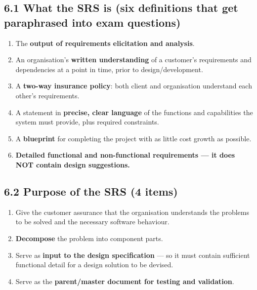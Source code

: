 \begin{studycolumns}
\vspace{0pt}



\subsection*{6.1 What the SRS is (six definitions that get paraphrased into exam questions)}
\begin{enumerate}
\item The \textbf{output of requirements elicitation and analysis}.
\item An organisation's \textbf{written understanding} of a customer's requirements and dependencies at a point in time, prior to design/\allowbreak{}development.
\item A \textbf{two-way insurance policy}: both client and organisation understand each other's requirements.
\item A statement in \textbf{precise, clear language} of the functions and capabilities the system must provide, plus required constraints.
\item A \textbf{blueprint} for completing the project with as little cost growth as possible.
\item \textbf{Detailed functional and non-functional requirements --- it does NOT contain design suggestions.}
\end{enumerate}
\subsection*{6.2 Purpose of the SRS (4 items)}
\begin{enumerate}
\item Give the customer assurance that the organisation understands the problems to be solved and the necessary software behaviour.
\item \textbf{Decompose} the problem into component parts.
\item Serve as \textbf{input to the design specification} --- so it must contain sufficient functional detail for a design solution to be devised.
\item Serve as the \textbf{parent/\allowbreak{}master document for testing and validation}.
\end{enumerate}
\end{studycolumns}

